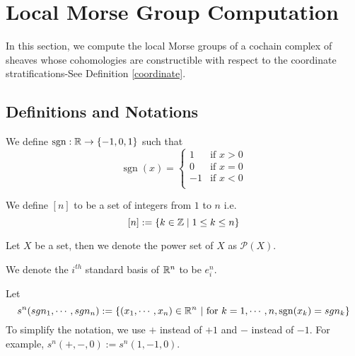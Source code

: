 \section{Local Morse Group Computation}
In this section, we compute the local Morse groups of a cochain complex of sheaves whose cohomologies are constructible with respect to the coordinate stratifications-See Definition \ref{coordinate}.
\subsection*{Definitions and Notations}
\begin{definition}
We define $\operatorname{sgn} : \mathbb{R} \rightarrow \{-1,0,1\}$ such that
\[
\operatorname{sgn}(x)=
\begin{cases}
    1 & \text{if } x>0\\
    0 & \text{if } x=0\\
    -1 & \text{if } x<0\\
\end{cases}
\]
\end{definition}
\begin{definition}
We define $[n]$ to be a set of integers from $1$ to $n$ i.e.
\[
[n] := \{k \in \mathbb{Z} \mid 1\leq k \leq n\}
\]
\end{definition}
\begin{definition}
Let $X$ be a set, then we denote the power set of $X$ as $\mathcal{P}(X)$.
\end{definition}
\begin{definition}
We denote the $i^{th}$ standard basis of $\mathbb{R}^n$ to be $e^n_i$.
\end{definition}
\begin{definition}
Let
\[
s^n(sgn_1,\cdots,sgn_n):= \{(x_1,\cdots,x_n)\in \mathbb{R}^n ~|~ \text{for }k=1,\cdots,n, \operatorname{sgn}(x_k)=sgn_k\}
\]
To simplify the notation, we use $+$ instead of $+1$ and $-$ instead of $-1$. For example, $s^n(+,-,0):= s^n(1,-1,0)$.
\end{definition}
